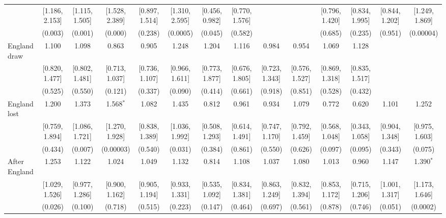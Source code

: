\documentclass[12pt, a4paper]{article}
\begin{document}
\begin{table}
{\begin{threeparttable}
\begin{tabular}{@{\extracolsep{1pt}}lccccccccccccc}
  & [1.186, 2.153] & [1.115, 1.505] & [1.528, 2.389] & [0.897, 1.514] & [1.310, 2.595] & [0.456, 0.982] & [0.770, 1.576] &  &  & [0.796, 1.420] & [0.834, 1.995] & [0.844, 1.202] & [1.249, 1.869] \\
  & (0.003) & (0.001) & (0.000) & (0.238) & (0.0005) & (0.045) & (0.582) &  &  & (0.685) & (0.235) & (0.951) & (0.00004) \\
  England draw & 1.100 & 1.098 & 0.863 & 0.905 & 1.248 & 1.204 & 1.116 & 0.984 & 0.954 & 1.069 & 1.128 &  &  \\
  & [0.820, 1.477] & [0.802, 1.481] & [0.713, 1.037] & [0.736, 1.107] & [0.966, 1.611] & [0.773, 1.877] & [0.676, 1.805] & [0.723, 1.343] & [0.576, 1.527] & [0.869, 1.318] & [0.835, 1.517] &  &  \\
  & (0.525) & (0.550) & (0.121) & (0.337) & (0.090) & (0.414) & (0.661) & (0.918) & (0.851) & (0.528) & (0.432) &  &  \\
  England lost & 1.200 & 1.373 & 1.568$^{*}$ & 1.082 & 1.435 & 0.812 & 0.961 & 0.934 & 1.079 & 0.772 & 0.620 & 1.101 & 1.252 \\
  & [0.759, 1.894] & [1.086, 1.721] & [1.270, 1.928] & [0.838, 1.389] & [1.036, 1.992] & [0.508, 1.293] & [0.614, 1.491] & [0.747, 1.170] & [0.792, 1.459] & [0.568, 1.048] & [0.343, 1.058] & [0.904, 1.348] & [0.975, 1.603] \\
  & (0.434) & (0.007) & (0.00003) & (0.540) & (0.031) & (0.384) & (0.861) & (0.550) & (0.626) & (0.097) & (0.095) & (0.343) & (0.075) \\
  After England & 1.253 & 1.122 & 1.024 & 1.049 & 1.132 & 0.814 & 1.108 & 1.037 & 1.080 & 1.013 & 0.960 & 1.147 & 1.390$^{*}$ \\
  & [1.029, 1.526] & [0.977, 1.286] & [0.900, 1.162] & [0.905, 1.194] & [0.933, 1.331] & [0.535, 1.092] & [0.834, 1.381] & [0.863, 1.249] & [0.832, 1.394] & [0.853, 1.172] & [0.715, 1.206] & [1.001, 1.317] & [1.173, 1.646] \\
  & (0.026) & (0.100) & (0.718) & (0.515) & (0.223) & (0.147) & (0.464) & (0.697) & (0.561) & (0.878) & (0.746) & (0.051) & (0.0002) \\



\end{tabular}
\end{threeparttable}}
\end{table}
\end{document}
